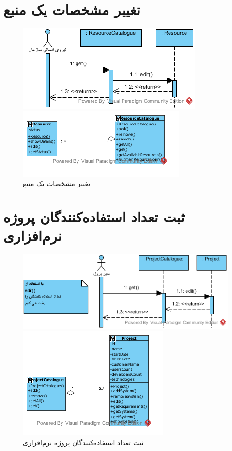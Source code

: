 \section{تغییر مشخصات یک منبع}
\begin{figure}[H]
	\centering
	\includegraphics[scale=1]{img/sequence-analysis/EditResourceAttributes}
	
	
	\includegraphics[scale=1]{img/sequence-analysis/EditResourceAttributesC}
	\caption{تغییر مشخصات یک منبع}
\end{figure}

\section{ثبت تعداد استفاده‌کنندگان پروژه نرم‌افزاری}
\begin{figure}[H]
	\centering
	\includegraphics[scale=0.8]{img/sequence-analysis/AddUsersCount}
	
	
	\includegraphics[scale=0.8]{img/sequence-analysis/AddUsersCountC}
	\caption{ثبت تعداد استفاده‌کنندگان پروژه نرم‌افزاری}
\end{figure}


